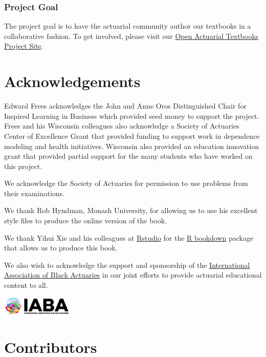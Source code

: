 \documentclass[]{book}
\begin{document}
\subsubsection*{Project Goal}\label{project-goal}

The project goal is to have the actuarial community author our textbooks
in a collaborative fashion. To get involved, please visit our
\href{https://sites.google.com/a/wisc.edu/loss-data-analytics/}{Open
Actuarial Textbooks Project Site}.

\section*{Acknowledgements}\label{acknowledgements}

Edward Frees acknowledges the John and Anne Oros Distinguished Chair for
Inspired Learning in Business which provided seed money to support the
project. Frees and his Wisconsin colleagues also acknowledge a Society
of Actuaries Center of Excellence Grant that provided funding to support
work in dependence modeling and health initiatives. Wisconsin also
provided an education innovation grant that provided partial support for
the many students who have worked on this project.

We acknowledge the Society of Actuaries for permission to use problems
from their examinations.

We thank Rob Hyndman, Monash University, for allowing us to use his
excellent style files to produce the online version of the book.

We thank Yihui Xie and his colleagues at
\href{https://www.rstudio.com/}{Rstudio} for the
\href{https://bookdown.org/yihui/bookdown/}{R bookdown} package that
allows us to produce this book.

We also wish to acknowledge the support and sponsorship of the
\href{http://www.blackactuaries.org/}{International Association of Black
Actuaries} in our joint efforts to provide actuarial educational content
to all.

\includegraphics[width=0.25000\textwidth]{Figures/IABA.png}

\section*{Contributors}\label{contributors}
\end{document}
